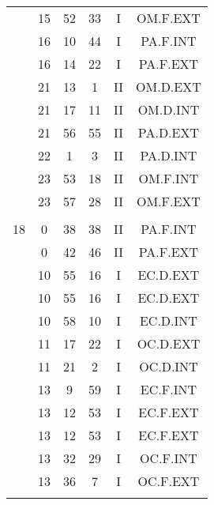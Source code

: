 \documentclass[12pt, a4paper]{article}
\begin{document}
\begin{multicols}{3}
{\begin{tabular}{c c c c c c}
	 	 	 	 & 15 & 52 & 33 & I & OM.F.EXT\\%
	 	 	 	 & 16 & 10 & 44 & I & PA.F.INT\\%
	 	 	 	 & 16 & 14 & 22 & I & PA.F.EXT\\%
	 	 	 	 & 21 & 13 & 1 & II & OM.D.EXT\\%
	 	 	 	 & 21 & 17 & 11 & II & OM.D.INT\\%
	 	 	 	 & 21 & 56 & 55 & II & PA.D.EXT\\%
	 	 	 	 & 22 & 1 & 3 & II & PA.D.INT\\%
	 	 	 	 & 23 & 53 & 18 & II & OM.F.INT\\%
	 	 	 	 & 23 & 57 & 28 & II & OM.F.EXT\\%
	 	 	 	 & & & & & \\%
	 	 	 	18 & 0 & 38 & 38 & II & PA.F.INT\\%
	 	 	 	 & 0 & 42 & 46 & II & PA.F.EXT\\%
	 	 	 	 & 10 & 55 & 16 & I & EC.D.EXT\\%
	 	 	 	 & 10 & 55 & 16 & I & EC.D.EXT\\%
	 	 	 	 & 10 & 58 & 10 & I & EC.D.INT\\%
	 	 	 	 & 11 & 17 & 22 & I & OC.D.EXT\\%
	 	 	 	 & 11 & 21 & 2 & I & OC.D.INT\\%
	 	 	 	 & 13 & 9 & 59 & I & EC.F.INT\\%
	 	 	 	 & 13 & 12 & 53 & I & EC.F.EXT\\%
	 	 	 	 & 13 & 12 & 53 & I & EC.F.EXT\\%
	 	 	 	 & 13 & 32 & 29 & I & OC.F.INT\\%
	 	 	 	 & 13 & 36 & 7 & I & OC.F.EXT\\%
	 	 	 	 & & & & & \\%

\end{tabular}}
\end{multicols}
\end{document}
